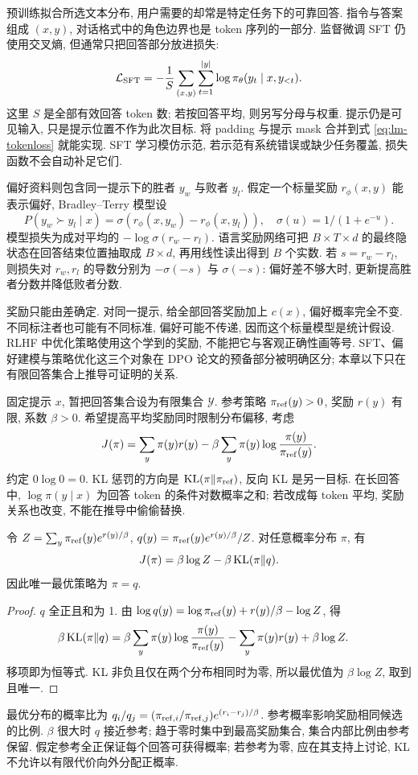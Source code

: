 \label{ch:posttrain}
\label{sec:lm-sft}
预训练拟合所选文本分布, 用户需要的却常是特定任务下的可靠回答. 指令与答案组成 $(x,y)$, 对话格式中的角色边界也是 token 序列的一部分. 监督微调 SFT 仍使用交叉熵, 但通常只把回答部分放进损失:
\[
\mathcal L_{\rm SFT}=-\frac1S\sum_{(x,y)}\sum_{t=1}^{|y|}\log\pi_\theta(y_t\mid x,y_{<t}).
\]
这里 $S$ 是全部有效回答 token 数; 若按回答平均, 则另写分母与权重. 提示仍是可见输入, 只是提示位置不作为此次目标. 将 padding 与提示 mask 合并到式 \eqref{eq:lm-tokenloss} 就能实现. SFT 学习模仿示范, 若示范有系统错误或缺少任务覆盖, 损失函数不会自动补足它们.

偏好资料则包含同一提示下的胜者 $y_w$ 与败者 $y_l$. 假定一个标量奖励 $r_\phi(x,y)$ 能表示偏好, Bradley--Terry 模型设
\[
P(y_w\succ y_l\mid x)=\sigma(r_\phi(x,y_w)-r_\phi(x,y_l)),\quad
\sigma(u)=1/(1+e^{-u}).
\]
模型损失为成对平均的 $-\log\sigma(r_w-r_l)$. 语言奖励网络可把 $B\times T\times d$ 的最终隐状态在回答结束位置抽取成 $B\times d$, 再用线性读出得到 $B$ 个实数. 若 $s=r_w-r_l$, 则损失对 $r_w,r_l$ 的导数分别为 $-\sigma(-s)$ 与 $\sigma(-s)$: 偏好差不够大时, 更新提高胜者分数并降低败者分数.

奖励只能由差确定. 对同一提示, 给全部回答奖励加上 $c(x)$, 偏好概率完全不变. 不同标注者也可能有不同标准, 偏好可能不传递, 因而这个标量模型是统计假设. RLHF 中优化策略使用这个学到的奖励, 不能把它与客观正确性画等号. SFT、偏好建模与策略优化这三个对象在 DPO 论文的预备部分被明确区分\cite{dpo}; 本章以下只在有限回答集合上推导可证明的关系.

\label{sec:lm-dpo}
固定提示 $x$, 暂把回答集合设为有限集合 $\mathcal Y$. 参考策略 $\pi_{\rm ref}(y)>0$, 奖励 $r(y)$ 有限, 系数 $\beta>0$. 希望提高平均奖励同时限制分布偏移, 考虑
\[
J(\pi)=\sum_y\pi(y)r(y)-\beta\sum_y\pi(y)\log\frac{\pi(y)}{\pi_{\rm ref}(y)}.
\]
约定 $0\log0=0$. KL 惩罚的方向是 $\operatorname{KL}(\pi\Vert\pi_{\rm ref})$, 反向 KL 是另一目标. 在长回答中, $\log\pi(y\mid x)$ 为回答 token 的条件对数概率之和; 若改成每 token 平均, 奖励关系也改变, 不能在推导中偷偷替换.

\begin{theorem}\label{thm:finite-kl-policy}
令 $Z=\sum_y\pi_{\rm ref}(y)e^{r(y)/\beta}$, $q(y)=\pi_{\rm ref}(y)e^{r(y)/\beta}/Z$. 对任意概率分布 $\pi$, 有
\[
J(\pi)=\beta\log Z-\beta\operatorname{KL}(\pi\Vert q).
\]
因此唯一最优策略为 $\pi=q$.
\end{theorem}
\begin{proof}
$q$ 全正且和为 1. 由 $\log q(y)=\log\pi_{\rm ref}(y)+r(y)/\beta-\log Z$, 得
\begin{align*}
\beta\operatorname{KL}(\pi\Vert q)
&=\beta\sum_y\pi(y)\log\frac{\pi(y)}{\pi_{\rm ref}(y)}
 -\sum_y\pi(y)r(y)+\beta\log Z.
\end{align*}
移项即为恒等式. KL 非负且仅在两个分布相同时为零, 所以最优值为 $\beta\log Z$, 取到且唯一.
\end{proof}
最优分布的概率比为 $q_i/q_j=(\pi_{{\rm ref},i}/\pi_{{\rm ref},j})e^{(r_i-r_j)/\beta}$. 参考概率影响奖励相同候选的比例. $\beta$ 很大时 $q$ 接近参考; 趋于零时集中到最高奖励集合, 集合内部比例由参考保留. 假定参考全正保证每个回答可获得概率; 若参考为零, 应在其支持上讨论, KL 不允许以有限代价向外分配正概率.

